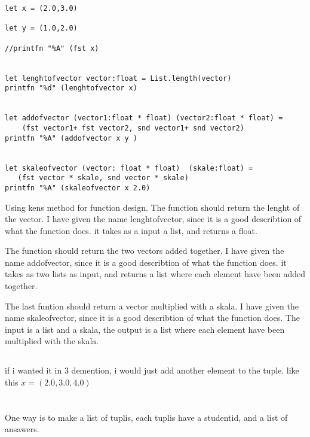 \documentclass{article}
\begin{document}
\subsection{}


    \begin{lstlisting}

let x = (2.0,3.0)

let y = (1.0,2.0)

//printfn "%A" (fst x)


let lenghtofvector vector:float = List.length(vector)
printfn "%d" (lenghtofvector x)


let addofvector (vector1:float * float) (vector2:float * float) = 
    (fst vector1+ fst vector2, snd vector1+ snd vector2)
printfn "%A" (addofvector x y )


let skaleofvector (vector: float * float)  (skale:float) = 
   (fst vector * skale, snd vector * skale)
printfn "%A" (skaleofvector x 2.0)
    \end{lstlisting}


Using kens method for function design. The function should return the lenght of the vector. I have given the name lenghtofvector, since it is a good describtion of what the function does. it takes as a input a list, and returns a float. 

The function should return the two vectors added together. I have given the name addofvector, since it is a good describtion of what the function does. it takes as two lists as input, and returns a list where each element have been added together. 

The last funtion should return a vector multiplied with a skala. I have given the name skaleofvector, since it is a good describtion of what the function does. The input is a list and a skala, the output is a list where each element have been multiplied with the skala. 

\subsection{}
if i wanted it in 3 demention, i would just add another element to the tuple. like this
$x = (2.0, 3.0, 4.0)$




\section{}

\subsection{}
One way is to make a list of tuplis, each tuplis have a studentid, and a list of ansawers.
\end{document}
